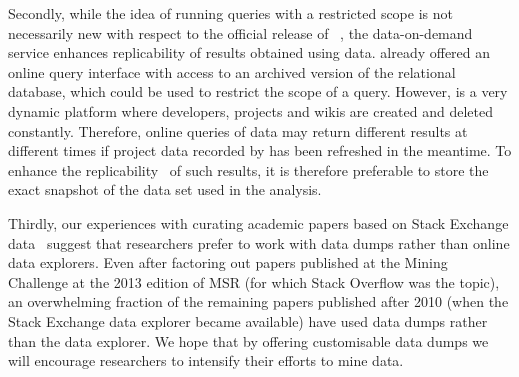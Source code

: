 Secondly, while the idea of running queries with a restricted scope is not necessarily new with respect to
the official release of \linebreak \ght~\cite{gousios2013ghtorent}, the data-on-demand service enhances replicability
of results obtained using \ght data. 
\ght already offered an online query interface with access to an archived version of the relational database, 
which could be used to restrict the scope of a query.
However, \gh is a very dynamic platform where developers, projects and wikis are created and deleted constantly.
Therefore, online queries of \ght data may return different results at different times if project data recorded
by \ght has been refreshed in the meantime.
To enhance the replicability~\cite{gonzalez2012reproducibility} of such results, it is therefore preferable to 
store the exact snapshot of the data set used in the analysis.

Thirdly, our experiences with curating academic papers based on Stack Exchange data~\cite{vasilescu2012meta} 
suggest that researchers prefer to work with data dumps rather than online data explorers.
Even after factoring out papers published at the Mining Challenge at the 2013 edition of MSR (for which Stack 
Overflow was the topic), an overwhelming fraction of the remaining papers published after 2010 (when the Stack 
Exchange data explorer became available) have used data dumps rather than the data explorer.
We hope that by offering customisable \ght data dumps we will encourage researchers to intensify their efforts
to mine \gh data.

